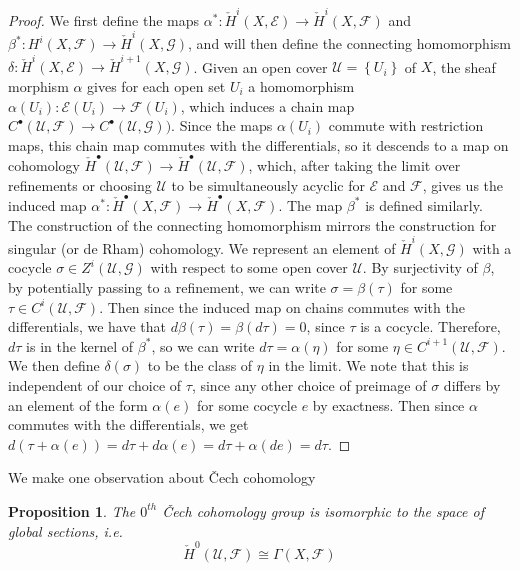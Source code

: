 \documentclass[psamsfonts, 12pt]{amsart}
\newtheorem{prop}[thm]{Proposition}
\theoremstyle{definition}
\theoremstyle{remark}
\newcommand{\set}[1]{\left\lbrace #1 \right\rbrace}
\begin{document}
\begin{proof}
We first define the maps
$\alpha^* : \check{H}^i(X,\mathcal{E}) \to \check{H}^i(X, \mathcal{F})$
and $\beta^* : H^i(X, \mathcal{F}) \to \check{H}^i(X, \mathcal{G})$, and will then define
the connecting homomorphism
$\delta : \check{H}^i(X,\mathcal{E}) \to \check{H}^{i+1}(X, \mathcal{G})$. Given
an open cover $\mathcal{U} = \set{U_i}$ of $X$, the sheaf morphism $\alpha$ gives for
each open set $U_i$ a homomorphism $\alpha(U_i) : \mathcal{E}(U_i) \to \mathcal{F}(U_i)$,
which induces a chain map
$C^\bullet(\mathcal{U},\mathcal{F}) \to C^\bullet(\mathcal{U}, \mathcal{G}))$. Since
the maps $\alpha(U_i)$ commute with restriction maps, this chain map commutes with
the differentials, so it descends to a map on cohomology
$\check{H}^\bullet(\mathcal{U},\mathcal{F})\to\check{H}^\bullet(\mathcal{U},\mathcal{F})$,
which, after taking the limit over refinements or choosing $\mathcal{U}$ to be
simultaneously acyclic for $\mathcal{E}$ and $\mathcal{F}$, gives us the induced
map $\alpha^* : \check{H}^\bullet(X,\mathcal{F})\to\check{H}^\bullet(X,\mathcal{F})$.
The map $\beta^*$ is defined similarly. \\

The construction of the connecting homomorphism
mirrors the construction for singular (or de Rham) cohomology. We represent
an element of $\check{H}^i(X,\mathcal{G})$ with a cocycle
$\sigma \in Z^i(\mathcal{U}, \mathcal{G})$ with respect to some open cover $\mathcal{U}$.
By surjectivity of $\beta$, by potentially passing to a refinement, we can
write $\sigma = \beta(\tau)$ for some $\tau \in C^i(\mathcal{U}, \mathcal{F})$. Then
since the induced map on chains commutes with the differentials, we have that
$d\beta(\tau) = \beta(d\tau) = 0$, since $\tau$ is a cocycle. Therefore,
$d\tau$ is in the kernel of $\beta^*$, so we can write $d\tau = \alpha(\eta)$
for some $\eta \in C^{i+1}(\mathcal{U}, \mathcal{F})$. We then define
$\delta(\sigma)$ to be the class of $\eta$ in the limit. We note that
this is independent of our choice of $\tau$, since any other choice of
preimage of $\sigma$ differs by an element of the form $\alpha(e)$ for some cocycle
$e$ by exactness. Then since $\alpha$ commutes with the differentials, we get
$d(\tau + \alpha(e)) = d\tau + d\alpha(e) = d\tau + \alpha(de) = d\tau$.
\end{proof}
%
We make one observation about \v{C}ech cohomology
%
\begin{prop}
The $0^{th}$ \v{C}ech cohomology group is isomorphic to the space of global sections,
i.e.
\[
\check{H}^0(\mathcal{U}, \mathcal{F}) \cong \Gamma(X, \mathcal{F})
\]
\end{prop}
\end{document}
